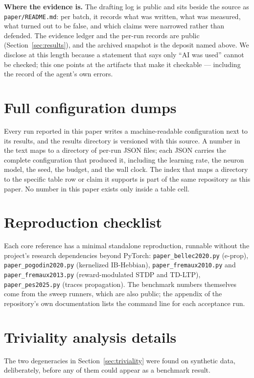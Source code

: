 \documentclass[11pt]{article}
\begin{document}
\textbf{Where the evidence is.} The drafting log is public and sits beside the
source as \texttt{paper/\allowbreak README.md}: per batch, it records what was written, what
was measured, what turned out to be false, and which claims were narrowed rather
than defended. The evidence ledger and the per-run records are public
(Section~\ref{sec:results}), and the archived snapshot is the deposit named
above. We disclose at this length because a statement that says only ``AI was
used'' cannot be checked; this one points at the artifacts that make it
checkable --- including the record of the agent's own errors.



\appendix
\section{Full configuration dumps}
Every run reported in this paper writes a machine-readable configuration next to
its results, and the results directory is versioned with this source. A number
in the text maps to a directory of per-run JSON files; each JSON carries the
complete configuration that produced it, including the learning rate, the neuron
model, the seed, the budget, and the wall clock. The index that maps a directory
to the specific table row or claim it supports is part of the same repository as
this paper. No number in this paper exists only inside a table cell.

\section{Reproduction checklist}
Each core reference has a minimal standalone reproduction, runnable without the
project's research dependencies beyond PyTorch:
\texttt{paper\_bellec2020.py} (e-prop), \texttt{paper\_pogodin2020.py}
(kernelized IB-Hebbian), \texttt{paper\_fremaux2010.py} and
\texttt{paper\_fremaux2013.py} (reward-modulated STDP and TD-LTP),
\texttt{paper\_pes2025.py} (traces propagation). The benchmark numbers
themselves come from the sweep runners, which are also public; the appendix of
the repository's own documentation lists the command line for each acceptance
run.

\section{Triviality analysis details}
The two degeneracies in Section~\ref{sec:triviality} were found on synthetic
data, deliberately, before any of them could appear as a benchmark result.
\end{document}
